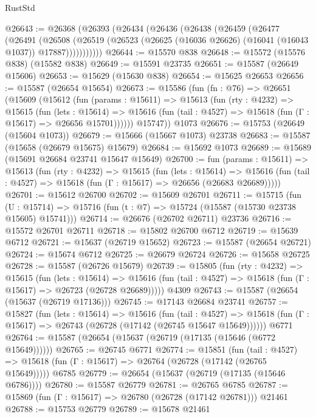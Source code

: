 \begin{lexlean}{RustStd}
\begin{coremodule}
@26643 := @26368
    (@26393
      (@26434
        (@26436
          (@26438
            (@26459
              (@26477
                (@26491
                  (@26508
                    (@26519
                      (@26523 (@26625 (@16036 @26626) (@16041 (@16043 @1037)) @17887)))))))))))
@26644 := @15570 @838
@26648 := @15572 (@15576 @838) (@15582 @838)
@26649 := @15591 @23735
@26651 := @15587 (@26649 @15606)
@26653 := @15629 (@15630 @838)
@26654 := @15625 @26653
@26656 := @15587 (@26654 @15654)
@26673 := @15586
    (fun (fn : @76) =>
    @26651
      (@15609
        (@15612
          (fun (params : @15611) =>
          @15613
            (fun (rty : @4232) =>
            @15615
              (fun (lets : @15614) =>
              @15616 (fun (tail : @4527) => @15618 (fun (Γ : @15617) => @26656 @15701))))))
        @15747))
    @1073
@26676 := @15753 (@26649 (@15604 @1073))
@26679 := @15666 (@15667 @1073) @23738
@26683 := @15587 (@15658 (@26679 @15675) @15679)
@26684 := @15692 @1073
@26689 := @15689 (@15691 @26684 @23741 @15647 @15649)
@26700 := fun (params : @15611) =>
  @15613
    (fun (rty : @4232) =>
    @15615
      (fun (lets : @15614) =>
      @15616 (fun (tail : @4527) => @15618 (fun (Γ : @15617) => @26656 (@26683 @26689)))))
@26701 := @15612 @26700
@26702 := @15609 @26701
@26711 := @15715
    (fun (U : @15714) => @15716 (fun (t : @7) => @15724 (@15587 (@15730 @23738 @15605) @15741)))
@26714 := @26676 (@26702 @26711) @23736
@26716 := @15572 @26701 @26711
@26718 := @15802 @26700 @6712
@26719 := @15639 @6712
@26721 := @15637 (@26719 @15652)
@26723 := @15587 (@26654 @26721)
@26724 := @15674 @6712
@26725 := @26679 @26724
@26726 := @15658 @26725
@26728 := @15587 (@26726 @15679)
@26739 := @15805
    (fun (rty : @4232) =>
    @15615
      (fun (lets : @15614) =>
      @15616 (fun (tail : @4527) => @15618 (fun (Γ : @15617) => @26723 (@26728 @26689)))))
    @4309
@26743 := @15587 (@26654 (@15637 (@26719 @17136)))
@26745 := @17143 @26684 @23741
@26757 := @15827
    (fun (lets : @15614) =>
    @15616
      (fun (tail : @4527) =>
      @15618 (fun (Γ : @15617) => @26743 (@26728 (@17142 (@26745 @15647 @15649))))))
    @6771
@26764 := @15587 (@26654 (@15637 (@26719 (@17135 (@15646 (@6772 @15649))))))
@26765 := @26745 @6771
@26774 := @15851
    (fun (tail : @4527) => @15618 (fun (Γ : @15617) => @26764 (@26728 (@17142 (@26765 @15649)))))
    @6785
@26779 := @26654 (@15637 (@26719 (@17135 (@15646 @6786))))
@26780 := @15587 @26779
@26781 := @26765 @6785
@26787 := @15869 (fun (Γ : @15617) => @26780 (@26728 (@17142 @26781))) @21461
@26788 := @15753 @26779
@26789 := @15678 @21461

\end{coremodule}
\end{lexlean}
